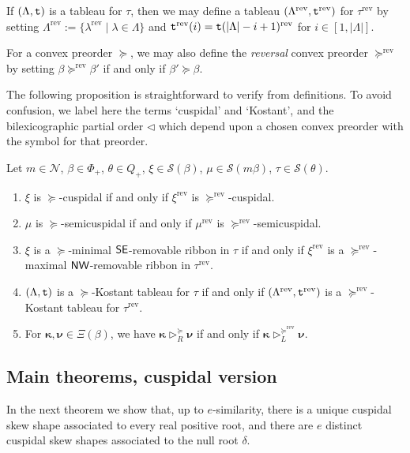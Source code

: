 \documentclass[Unicode,ALCO]{cedram}
\newcommand{\N}{\mathcal{N}}
\newcommand{\SSSS}{\mathcal{S}}
\newcommand{\0}{{\bar 0}}
\newcommand{\ttt}{{\tt t}}
\newcommand{\nnww}{{\sf NW}}
\newcommand{\ssee}{{\sf SE}}
\newcommand{\bkap}{\boldsymbol{\kappa}}
\newcommand{\bnu}{\boldsymbol{\nu}}
\def\rev{{\operatorname{rev}}}
\begin{document}
If \((\Lambda, \ttt)\) is a tableau for \(\tau\), then we may define a tableau \((\Lambda^\rev, \ttt^\rev)\) for \(\tau^\rev\) by setting \(\Lambda^\rev :=\{ \lambda^\rev \mid \lambda \in \Lambda\}\) and \(\ttt^\rev(i) = \ttt(|\Lambda| - i +1)^\rev\) for \(i \in [1,|\Lambda|]\).

For a convex preorder \(\succeq\), we may also define the {\em reversal} convex preorder \(\succeq^\rev\) by setting \(\beta \succeq^\rev \beta'\) if and only if \(\beta' \succeq \beta\). 

The following proposition is straightforward to verify from definitions. To avoid confusion, we label here the terms `cuspidal' and `Kostant', and the bilexicographic partial order \(\triangleleft\) which depend upon a chosen convex preorder with the symbol for that preorder.

\begin{prop}\label{revlem}
Let \(m \in \N\), \(\beta \in \Phi_+\), \(\theta \in Q_+\), \(\xi \in \SSSS(\beta)\), \(\mu \in \SSSS(m \beta)\), \(\tau \in \SSSS(\theta)\).
\begin{enumerate}
\item \(\xi\) is \(\succeq\)-cuspidal if and only if \(\xi^\rev\) is \(\succeq^\rev\)-cuspidal.
\item \(\mu\) is \(\succeq\)-semicuspidal if and only if \(\mu^\rev\) is \(\succeq^\rev\)-semicuspidal.
\item \(\xi\) is a \(\succeq\)-minimal \(\ssee\)-removable ribbon in \(\tau\) if and only if \(\xi^\rev\) is a \(\succeq^\rev\)-maximal \(\nnww\)-removable ribbon in \(\tau^\rev\).
\item \((\Lambda, \ttt)\) is a \(\succeq\)-Kostant tableau for \(\tau\) if and only if \((\Lambda^\rev, \ttt^\rev)\) is a \(\succeq^\rev\)-Kostant tableau for \(\tau^\rev\).
\item For \(\bkap, \bnu \in \Xi(\beta)\), we have \(\bkap \triangleright^{\succeq}_R \bnu\) if and only if \(\bkap \triangleright^{\succeq^\rev}_L \bnu\).
\end{enumerate}
\end{prop}

\subsection{Main theorems, cuspidal version}

In the next theorem we show that, up to \(e\)-similarity, there is a unique cuspidal skew shape associated to every real positive root, and there are \(e\) distinct cuspidal skew shapes associated to the null root \(\delta\).
\end{document}
